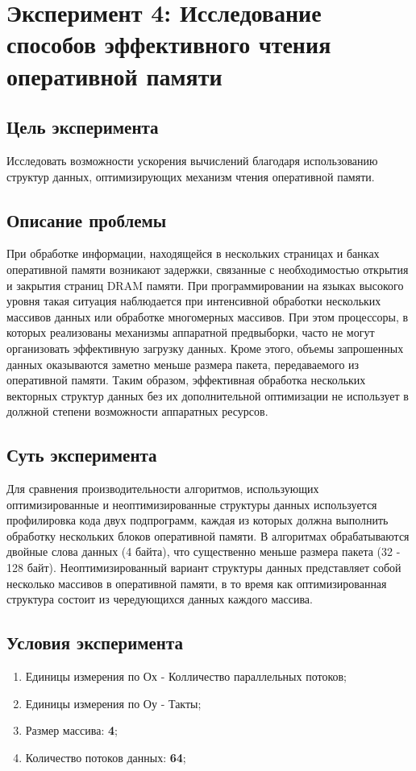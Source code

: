 \chapter{Эксперимент 4: Исследование способов эффективного чтения оперативной памяти}

\section{Цель эксперимента}
Исследовать возможности ускорения вычислений благодаря использованию структур данных, оптимизирующих механизм чтения оперативной памяти. 

\section{Описание проблемы}
При  обработке информации, находящейся в нескольких страницах и банках оперативной памяти возникают задержки, связанные с необходимостью открытия и закрытия страниц DRAM памяти. При программировании на языках высокого уровня такая ситуация наблюдается при интенсивной обработки нескольких массивов данных или обработке многомерных массивов. При этом процессоры, в которых реализованы механизмы аппаратной предвыборки, часто не могут организовать эффективную загрузку данных. Кроме этого, объемы запрошенных данных оказываются заметно меньше размера пакета, передаваемого из оперативной памяти. Таким образом, эффективная обработка нескольких векторных структур данных без их дополнительной оптимизации не использует в должной степени возможности аппаратных ресурсов. 

\section{Суть эксперимента}
Для сравнения производительности алгоритмов, использующих оптимизированные и неоптимизированные структуры данных используется профилировка кода двух подпрограмм, каждая из которых должна выполнить обработку нескольких блоков оперативной памяти. В алгоритмах обрабатываются двойные слова данных (4 байта), что существенно меньше размера пакета (32 - 128 байт). Неоптимизированный вариант структуры данных представляет собой несколько массивов в оперативной памяти, в то время как оптимизированная структура состоит из чередующихся данных каждого массива.

\section{Условия эксперимента}
\begin{enumerate}
    \item Единицы измерения по Ох - Колличество параллельных потоков;
    \item Единицы измерения по Оу - Такты;
    \item Размер массива: \textbf{4};
    \item Количество потоков данных: \textbf{64};
\end{enumerate}

